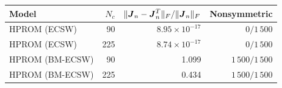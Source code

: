 \begin{tabular}{@{}lrrr@{}}
\toprule
Model & $N_c$ & $\|\boldsymbol{J}_n-\boldsymbol{J}_n^T\|_F/\|\boldsymbol{J}_n\|_F$ & Nonsymmetric\\
\midrule
HPROM (ECSW) & 90 & $8.95\times10^{-17}$ & $0/1\,500$\\
HPROM (ECSW) & 225 & $8.74\times10^{-17}$ & $0/1\,500$\\
HPROM (BM-ECSW) & 90 & 1.099 & $1\,500/1\,500$\\
HPROM (BM-ECSW) & 225 & 0.434 & $1\,500/1\,500$\\
\bottomrule
\end{tabular}
